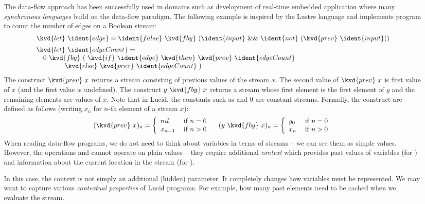 The data-flow approach has been successfully used in domains such as development of real-time embedded 
application where many \emph{synchronous languages} \cite{app-synchronous-lang} build on the data-flow
paradigm. The following example is inspired by the Lustre \cite{app-synchronous-lustre} language
and implements program to count the number of edges on a Boolean stream:
%
\begin{equation*}
\begin{array}{l}
\kvd{let}~\ident{edge} = \ident{false}~\kvd{fby}~(\ident{input}~\&\&~\ident{not}~(\kvd{prev}~\ident{input}))
\\[0.5em]
\kvd{let}~\ident{edgeCount} = \\
\quad 0~\kvd{fby}~ (~\kvd{if}~\ident{edge}~\kvd{then}~\kvd{prev}~\ident{edgeCount}\\
\quad\quad\quad~~~\, \kvd{else}~\kvd{prev}~\ident{edgeCount} ~)
\end{array}
\end{equation*}
%
The construct $\kvd{prev}~x$ returns a stream consisting of previous values of the stream 
$x$. The second value of $\kvd{prev}~x$ is first value of $x$ (and the first
value is undefined). The construct $y~\kvd{fby}~x$ returns a stream whose first element is the 
first element of $y$ and the remaining elements are values of $x$. Note that in Lucid, the constants
such as  and $0$ are constant streams. Formally, the construct are defined as follows
(writing $x_n$ for $n$-th element of a stream $x$):
%
\[ 
(\kvd{prev}~x)_n = \left\{ 
  \begin{array}{ll}
    nil     & \; \text{if $n=0$}\\
    x_{n-1} & \; \text{if $n>0$}
  \end{array} \right.
\quad
(y~\kvd{fby}~x)_n = \left\{ 
  \begin{array}{ll}
    y_0     & \; \text{if $n=0$}\\
    x_n     & \; \text{if $n>0$}
  \end{array} \right.
\]  
%
When reading data-flow programs, we do not need to think about variables in terms of streams --
we can see them as simple values. However, the operations  and  cannot operate
on plain values -- they require additional \emph{context} which provides past values of variables
(for ) and information about the current location in the stream (for ). 

In this case, the context is not simply an additional (hidden) parameter. It completely changes
how variables must be represented. We may want to capture various \emph{contextual properties}
of Lucid programs. For example, how many past elements need to be cached when we evaluate the 
stream.

